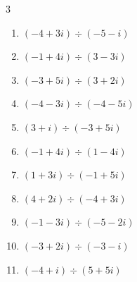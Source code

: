 \begin{multicols}{3}
\begin{enumerate}

  \item $\displaystyle (-4+3i)\div(-5-i)$


  \item $\displaystyle (-1+4i)\div(3-3i)$


  \item $\displaystyle (-3+5i)\div(3+2i)$


  \item $\displaystyle (-4-3i)\div(-4-5i)$


  \item $\displaystyle (3+i)\div(-3+5i)$


  \item $\displaystyle (-1+4i)\div(1-4i)$

        \phantom{$\displaystyle =-1$}

  \item $\displaystyle (1+3i)\div(-1+5i)$


\columnbreak %

  \item $\displaystyle (4+2i)\div(-4+3i)$


  \item $\displaystyle (-1-3i)\div(-5-2i)$


  \item $\displaystyle (-3+2i)\div(-3-i)$


  \item $\displaystyle (-4+i)\div(5+5i)$



\end{enumerate}
\end{multicols}
